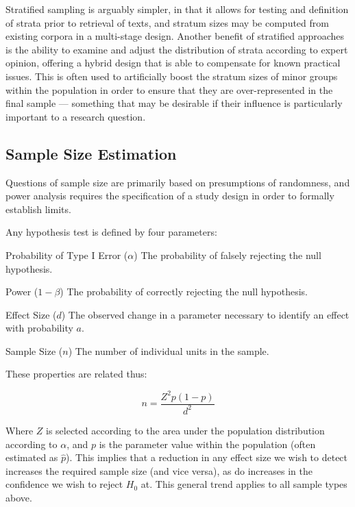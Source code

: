 Stratified sampling is arguably simpler, in that it allows for testing and definition of strata prior to retrieval of texts, and stratum sizes may be computed from existing corpora in a multi-stage design.  Another benefit of stratified approaches is the ability to examine and adjust the distribution of strata according to expert opinion, offering a hybrid design that is able to compensate for known practical issues.  This is often used to artificially boost the stratum sizes of minor groups within the population in order to ensure that they are over-represented in the final sample --- something that may be desirable if their influence is particularly important to a research question.



\subsection{Sample Size Estimation}
Questions of sample size are primarily based on presumptions of randomness, and power analysis requires the specification of a study design in order to formally establish limits.

Any hypothesis test is defined by four parameters\cite{ellis2010essential}:

\begin{itemizeTitle}
    \item[Probability of Type I Error ($\alpha$)] The probability of falsely rejecting the null hypothesis.
    \item[Power ($1 - \beta$)] The probability of correctly rejecting the null hypothesis.
    \item[Effect Size ($d$)] The observed change in a parameter necessary to identify an effect with probability $a$.
    \item[Sample Size ($n$)] The number of individual units in the sample.
\end{itemizeTitle}

These properties are related thus:

$$
n = \frac{Z^2p(1-p)}{d^2}
$$

Where $Z$ is selected according to the area under the population distribution according to $\alpha$, and $p$ is the parameter value within the population (often estimated as $\hat{p}$).  This implies that a reduction in any effect size we wish to detect increases the required sample size (and vice versa), as do increases in the confidence we wish to reject $H_0$ at.  This general trend applies to all sample types above.

